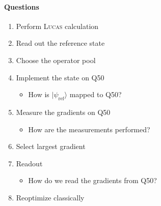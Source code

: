 \documentclass[english,a4paper,12pt]{article}
\begin{document}
\paragraph{Questions}

\begin{enumerate}
\item Perform \textsc{Lucas} calculation
\item Read out the reference state
\item Choose the operator pool
\item Implement the state on Q50
\begin{itemize}
\item How is $|\psi_\mathrm{ref}\rangle$ mapped to Q50?
\end{itemize}
\item Measure the gradients on Q50
\begin{itemize}
\item How are the measurements performed?
\end{itemize}
\item Select largest gradient
\item Readout
\begin{itemize}
\item How do we read the gradients from Q50?
\end{itemize}
\item Reoptimize classically
\end{enumerate}
\end{document}
